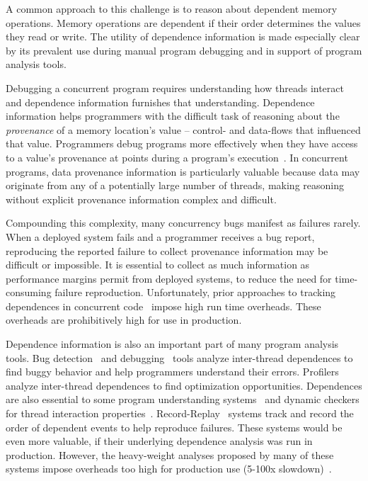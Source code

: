 \documentclass[preprint,9pt]{sigplanconf}
\begin{document}
A common approach to this challenge is to reason about dependent memory
operations.  Memory operations are dependent if their order determines the
values they read or write.  The utility of dependence information is made
especially clear by its prevalent use during manual program debugging and in
support of program analysis tools.

Debugging a concurrent program requires understanding how threads interact and
dependence information furnishes that understanding.  Dependence information
helps programmers with the difficult task of reasoning about the {\em
provenance} of a memory location's value -- control- and data-flows that
influenced that value.  Programmers debug programs more effectively when they
have access to a value's provenance at points during a program's
execution~\cite{tipslicingsurvey,whylineicse}.  In concurrent programs, data
provenance information is particularly valuable because data may originate from
any of a potentially large number of threads, making reasoning without explicit
provenance information complex and difficult.

Compounding this complexity, many concurrency bugs manifest as failures rarely.
When a deployed system fails and a programmer receives a bug report,
reproducing the reported failure to collect provenance information may be
difficult or impossible.  It is essential to collect as much information as
performance margins permit from deployed systems, to reduce the need for
time-consuming failure reproduction.  Unfortunately, prior approaches to
tracking dependences in concurrent code~\cite{raceslicing,tipslicingsurvey}
impose high run time overheads.  These overheads are prohibitively high for use
in production. 




Dependence information is also an important part of many program analysis
tools.    Bug detection~\cite{avio,fasttrack,raceslicing,dmtracker} and
debugging~\cite{tipslicingsurvey,bugaboo,recon,cci,defuse,conseq,falcon} tools
analyze inter-thread dependences to find buggy behavior and help programmers
understand their errors.
Profilers~\cite{threadclustering,schedpredictionmodel} analyze inter-thread
dependences to find optimization opportunities.  Dependences are also essential
to some program understanding systems~\cite{oshatr} and dynamic checkers for
thread interaction properties~\cite{oshajava,velodrome}.
Record-Replay~\cite{chimera,doubleplay,fdr,rtr} systems track and record the
order of dependent events to help reproduce failures.  These systems would be
even more valuable, if their underlying dependence analysis was run in
production.  However, the heavy-weight analyses proposed by many of these
systems impose overheads too high for production use (5-100x
slowdown)~\cite{raceslicing,dmtracker,velodrome,recon,defuse,oshajava,chimera,coredet,stm}.
\end{document}
